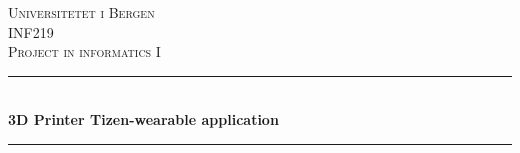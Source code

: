 \begin{titlepage}


    \newcommand{\HRule}{\rule{\linewidth}{0.5mm}} %

    \center %


    \textsc{\LARGE Universitetet i Bergen}\\[1.5cm] %
    \textsc{\Large INF219}\\[0.5cm] %
    \textsc{\large Project in informatics I}\\[0.5cm] %


    \HRule \\[0.4cm]
    { \huge \bfseries 3D Printer Tizen-wearable application}\\[0.4cm] %
    \HRule \\[1.5cm]


\end{titlepage}
